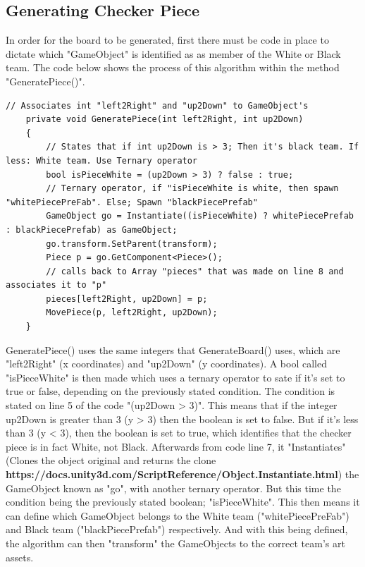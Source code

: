 \documentclass[10pt, a4paper]{article}
\begin{document}
	 \subsection{Generating Checker Piece}
	 In order for the board to be generated, first there must be code in place to dictate which "GameObject" is identified as as member of the White or Black team. The code below shows the process of this algorithm within the method "GeneratePiece()".
	 \\	 
	 \begin{lstlisting}[caption = GeneratePiece()]
	 // Associates int "left2Right" and "up2Down" to GameObject's
    private void GeneratePiece(int left2Right, int up2Down)
    {
        // States that if int up2Down is > 3; Then it's black team. If less: White team. Use Ternary operator
        bool isPieceWhite = (up2Down > 3) ? false : true;
        // Ternary operator, if "isPieceWhite is white, then spawn "whitePiecePreFab". Else; Spawn "blackPiecePrefab"
        GameObject go = Instantiate((isPieceWhite) ? whitePiecePrefab : blackPiecePrefab) as GameObject;
        go.transform.SetParent(transform);
        Piece p = go.GetComponent<Piece>();
        // calls back to Array "pieces" that was made on line 8 and associates it to "p"
        pieces[left2Right, up2Down] = p;
        MovePiece(p, left2Right, up2Down);
    }
	 \end{lstlisting}
	 GeneratePiece() uses the same integers that GenerateBoard() uses, which are "left2Right" (x coordinates) and "up2Down" (y coordinates). A bool called "isPieceWhite" is then made which uses a ternary operator to sate if it's set to true or false, depending on the previously stated condition. The condition is stated on line 5 of the code "(up2Down > 3)". This means that if the integer up2Down is greater than 3 (y > 3) then the boolean is set to false. But if it's less than 3 (y < 3), then the boolean is set to true, which identifies that the checker piece is in fact White, not Black. Afterwards from code line 7, it "Instantiates" (Clones the object original and returns the clone \textbf{https://docs.unity3d.com/ScriptReference/Object.Instantiate.html}) the GameObject known as "go", with another ternary operator. But this time the condition being the previously stated boolean; "isPieceWhite". This then means it can define which GameObject belongs to the White team ("whitePiecePreFab") and Black team ("blackPiecePrefab") respectively. And with this being defined, the algorithm can then "transform" the GameObjects to the correct team's art assets.
	 
\end{document}
